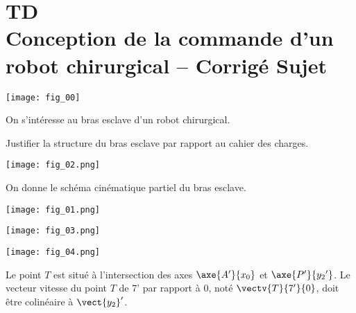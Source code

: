 \chapter*{TD  \\ 
Conception de la commande d’un robot chirurgical -- 
\ifprof Corrigé \else Sujet \fi}

\iflivret {} \else
\ifprof  {} \else \fi
\fi

\setcounter{question}{0}

\begin{marginfigure}[4cm]
\centering
\texttt{[image: fig\_00]}
\end{marginfigure}





On s'intéresse au bras esclave d'un robot chirurgical. 
\begin{obj}
Justifier la structure du bras esclave par rapport au cahier des charges.
\end{obj}
\ifprof
\else
\begin{center}
\texttt{[image: fig\_02.png]}
\end{center}

On donne le schéma cinématique partiel du bras esclave.

\begin{center}
\texttt{[image: fig\_01.png]}
\end{center}


\begin{center}
\texttt{[image: fig\_03.png]}
\end{center}


\begin{center}
\texttt{[image: fig\_04.png]}
\end{center}

Le point $T$ est situé à l’intersection des axes $\axe{A'}{{x_0}}$ et  $\axe{P'}{{y_2}'}$. 
Le vecteur vitesse du point $T$ de 7’ par rapport à 0, noté $\vectv{T}{7'}{0}$, doit être colinéaire à 
$\vect{y_2}'$.
\fi

